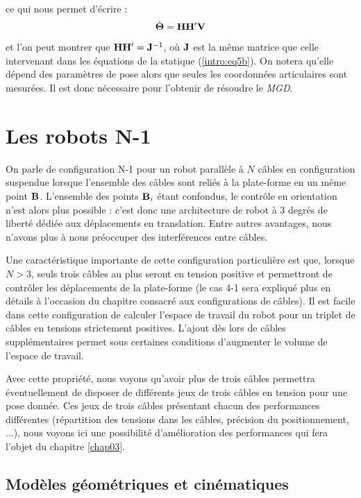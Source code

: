 ce qui nous permet d'\'ecrire :
\begin{equation}
\dot {\bf \Theta} = {\bf H} {\bf H}' {\bf V}
\label{intro:eq11d}
\end{equation}
et l'on peut montrer que ${\bf H}{\bf H}' = {\bf J}^{-1}$, o\`u $\bf J$ est la 
m\^eme matrice que celle intervenant dans les \'equations de la statique 
(\ref{intro:eq5b}). On notera qu'elle dépend des paramètres de pose alors que 
seules les coordonnées articulaires sont mesurées. Il est donc nécessaire pour 
l'obtenir de résoudre le {\it MGD}.

\section{Les robots N-1} \label{chap0-3}

On parle de configuration N-1 pour un robot parall\`ele \`a $N$ c\^ables en 
configuration suspendue lorsque l'ensemble des c\^ables sont reli\'es \`a la 
plate-forme en un m\^eme point ${\bf B}$. L'ensemble des points ${\bf B}_i$ 
étant confondus, le contr\^ole en orientation n'est alors plus possible : c'est 
donc une architecture de robot à 3 degrés de liberté d\'edi\'ee aux 
d\'eplacements en translation. Entre autres avantages, nous n'avons plus \`a 
nous pr\'eoccuper des interf\'erences entre c\^ables.

Une caractéristique importante de cette configuration particulière est 
que, lorsque $N > 3$, seuls trois c\^ables au plus seront en tension positive 
et permettront de contr\^oler les d\'eplacements de la plate-forme 
\cite{merlet2012} (le cas 4-1 sera expliqu\'e plus en d\'etails \`a l'occasion 
du chapitre consacr\'e aux configurations de c\^ables). Il est facile dans 
cette configuration de calculer l'espace de travail du robot pour un triplet de 
câbles en tensions strictement positives. L'ajout dès lors de câbles 
supplémentaires permet sous certaines conditions d'augmenter le volume de 
l'espace de travail.

Avec cette propriété, nous voyons qu'avoir plus de trois câbles permettra 
éventuellement de disposer de différents jeux de trois câbles en tension pour 
une pose donnée. Ces jeux de trois câbles présentant chacun des performances 
différentes (répartition des tensions dans les câbles, précision du 
positionnement, $\dots$), nous voyons ici une possibilité d'amélioration des 
performances qui fera l'objet du chapitre \ref{chap03}.

\subsection{Mod\`eles g\'eom\'etriques et cin\'ematiques} \label{chap0-3-0}

